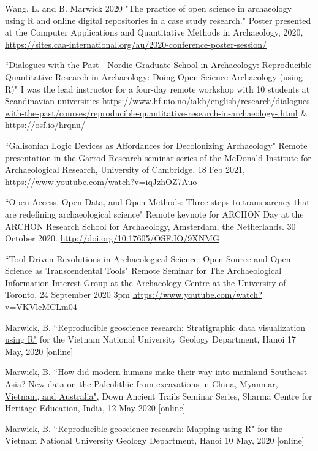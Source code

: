 \ind Wang, L. and B. Marwick 2020 "The practice of open science in archaeology using R and online digital repositories in a case study research." Poster presented at the Computer Applications and Quantitative Methods in Archaeology, 2020,  \url{https://sites.caa-international.org/au/2020-conference-poster-session/}   

\ind ``Dialogues with the Past - Nordic Graduate School in Archaeology: Reproducible Quantitative Research in Archaeology: Doing Open Science Archaeology (using R)" I was the lead instructor for a four-day remote workshop with 10 students at Scandinavian universities  \url{https://www.hf.uio.no/iakh/english/research/dialogues-with-the-past/courses/reproducible-quantitative-research-in-archaeology-.html} \&  \url{https://osf.io/hrqnu/}  

\ind ``Galisonian Logic Devices as Affordances for Decolonizing Archaeology" Remote presentation in the Garrod Research seminar series of the McDonald Institute for Archaeological Research, University of Cambridge. 18 Feb 2021,  \url{https://www.youtube.com/watch?v=iqJzhOZ7Auo}  

\ind ``Open Access, Open Data, and Open Methods: Three steps to transparency that are redefining archaeological science" Remote keynote for ARCHON Day at the ARCHON Research School for Archaeology, Amsterdam, the Netherlands. 30 October 2020.  \url{http://doi.org/10.17605/OSF.IO/9XNMG} 

\ind ``Tool-Driven Revolutions in Archaeological Science: Open Source and Open Science as Transcendental Tools" Remote Seminar for The Archaeological Information Interest Group at the Archaeology Centre at the University of Toronto, 24 September 2020 3pm  \url{https://www.youtube.com/watch?v=VKVlcMCLm04} 

\ind Marwick, B. \href{https://github.com/benmarwick/VNU-Geoscience-mapping-with-R-Workshop}{``Reproducible geoscience research: Stratigraphic data visualization using R"} for the Vietnam National University Geology Department, Hanoi 17 May, 2020 [online]

\ind Marwick, B. \href{http://www.sharmaheritage.com/down-ancient-trails-archaeology-forum-}{``How did modern humans make their way into mainland Southeast Asia? New data on the Paleolithic from excavations in China, Myanmar, Vietnam, and Australia"}, Down Ancient Trails Seminar Series, Sharma Centre for Heritage Education, India, 12 May 2020  [online]

\ind Marwick, B. \href{https://github.com/benmarwick/VNU-Geoscience-mapping-with-R-Workshop}{``Reproducible geoscience research: Mapping using R"} for the Vietnam National University Geology Department, Hanoi 10 May, 2020  [online]

